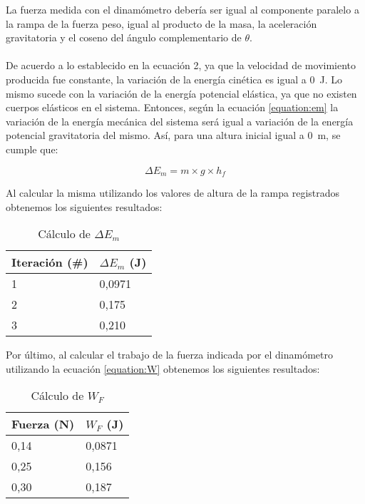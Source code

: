 \documentclass{article}
\begin{document}
La fuerza medida con el dinamómetro debería ser igual al componente paralelo a la rampa de la fuerza peso, igual al producto de la masa, la aceleración gravitatoria y el coseno del ángulo complementario de $\theta$.
\\
\\
De acuerdo a lo establecido en la ecuación 2, ya que la velocidad de movimiento producida fue constante, la variación de la energía cinética es igual a \qty{0}{J}. Lo mismo sucede con la variación de la energía potencial elástica, ya que no existen cuerpos elásticos en el sistema.  Entonces, según la ecuación \ref{equation:em} la variación de la energía mecánica del sistema será igual a variación de la energía potencial gravitatoria del mismo. Así, para una altura inicial igual a \qty{0}{m}, se cumple que:

\begin{equation}
\Delta E_m = m \times g \times h_f
\end{equation}

Al calcular la misma utilizando los valores de altura de la rampa registrados obtenemos los siguientes resultados:

\begin{table}[H]
\centering
\begin{tabular}{|l|l|}
\hline
\rowcolor[HTML]{C0C0C0} 
Iteración (\#) & $\Delta E_m$ (J) \\ \hline
1 & 0,0971 \\ \hline
2 & 0,175 \\ \hline
3 & 0,210 \\ \hline
\end{tabular}
\caption{Cálculo de $\Delta E_m$}
\label{table:calculoem}
\end{table}

Por último, al calcular el trabajo de la fuerza indicada por el dinamómetro utilizando la ecuación \ref{equation:W} obtenemos los siguientes resultados:

\begin{table}[H]
\centering
\begin{tabular}{|l|l|}
\hline
\rowcolor[HTML]{C0C0C0} 
Fuerza (N) & $W_F$ (J) \\ \hline
0,14 & 0,0871 \\ \hline
0,25 & 0,156 \\ \hline
0,30 & 0,187 \\ \hline
\end{tabular}
\caption{Cálculo de $W_F$}
\label{table:calculowf}
\end{table}
\end{document}
